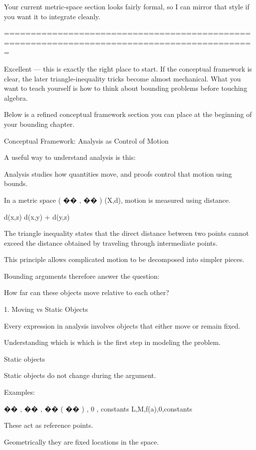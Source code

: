 Your current metric-space section looks fairly formal, so I can mirror that style if you want it to integrate cleanly.









=============================================================================================


Excellent — this is exactly the right place to start. If the conceptual framework is clear, the later triangle-inequality tricks become almost mechanical. What you want to teach yourself is how to think about bounding problems before touching algebra.

Below is a refined conceptual framework section you can place at the beginning of your bounding chapter.

Conceptual Framework: Analysis as Control of Motion

A useful way to understand analysis is this:

Analysis studies how quantities move, and proofs control that motion using bounds.

In a metric space 
(
��
,
��
)
(X,d), motion is measured using distance.

d(x,z) \le d(x,y) + d(y,z)

The triangle inequality states that the direct distance between two points cannot exceed the distance obtained by traveling through intermediate points.

This principle allows complicated motion to be decomposed into simpler pieces.

Bounding arguments therefore answer the question:

How far can these objects move relative to each other?

1. Moving vs Static Objects

Every expression in analysis involves objects that either move or remain fixed.

Understanding which is which is the first step in modeling the problem.

Static objects

Static objects do not change during the argument.

Examples:

��
,
��
,
��
(
��
)
,
0
,
constants
L,M,f(a),0,constants

These act as reference points.

Geometrically they are fixed locations in the space.


